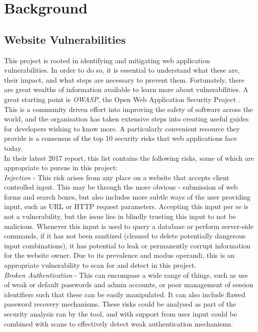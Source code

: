 \chapter{Background}

\section {Website Vulnerabilities}
\label{vulnerabilities}

This project is rooted in identifying and mitigating web application vulnerabilities. In order to do so, it is essential to understand what these are, their impact, and what steps are necessary to prevent them. Fortunately, there are great wealths of information available to learn more about vulnerabilities. A great starting point is \textit{OWASP}, the Open Web Application Security Project \cite{owaspPage}. This is a community driven effort into improving the safety of software across the world, and the organisation has taken extensive steps into creating useful guides for developers wishing to know more. A particularly convenient resource they provide is a consensus of the top 10 security risks that web applications face today. \\

In their latest 2017 report, this list contains the following risks, some of which are appropriate to pursue in this project: \\

	\emph{Injection} - This risk arises from any place on a website that accepts client controlled input. This may be through the more obvious - submission of web forms and search boxes, but also includes more subtle ways of the user providing input, such as URL or HTTP request parameters. Accepting this input per se is not a vulnerability, but the issue lies in blindly trusting this input to not be malicious. Whenever this input is used to query a database or perform server-side commands, if it has not been sanitized (cleaned to delete potentially dangerous input combinations), it has potential to leak or permanently corrupt information for the website owner. Due to its prevalence and modus operandi, this is an appropriate vulnerability to scan for and detect in this project. \\
	
	\emph{Broken Authentication} - This can encompass a wide range of things, such as use of weak or default passwords and admin accounts, or poor management of session identifiers such that these can be easily manipulated. It can also include flawed password recovery mechanisms. These risks could be analysed as part of the security analysis ran by the tool, and with support from user input could be combined with scans to effectively detect weak authentication mechanisms. \\
	
